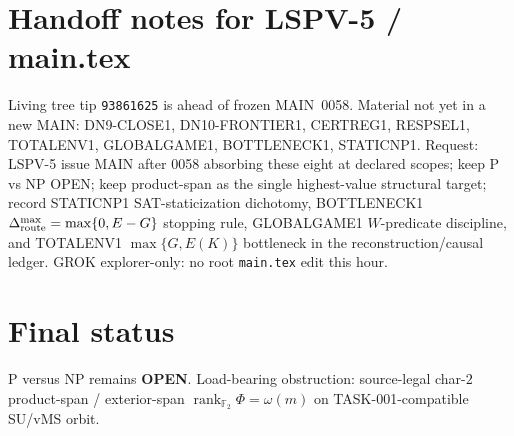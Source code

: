 \documentclass[11pt]{article}
\begin{document}
\section*{Handoff notes for LSPV-5 / main.tex}
Living tree tip \texttt{93861625} is ahead of frozen MAIN~0058. Material not yet
in a new MAIN: DN9-CLOSE1, DN10-FRONTIER1, CERTREG1, RESPSEL1, TOTALENV1,
GLOBALGAME1, BOTTLENECK1, STATICNP1. Request: LSPV-5 issue MAIN after 0058 absorbing
these eight at declared scopes; keep P vs NP OPEN; keep product-span as the single
highest-value structural target; record STATICNP1 SAT-staticization dichotomy,
BOTTLENECK1 $\Delta_{\rm route}^{\max}=\max\{0,E-G\}$ stopping rule, GLOBALGAME1
$W$-predicate discipline, and TOTALENV1 $\max\{G,E(K)\}$ bottleneck in the
reconstruction/causal ledger. GROK explorer-only: no root \texttt{main.tex} edit this
hour.

\section*{Final status}
P versus NP remains \textbf{OPEN}.
Load-bearing obstruction: source-legal char-$2$ product-span / exterior-span
$\operatorname{rank}_{\mathbb F_2}\Phi=\omega(m)$ on TASK-001-compatible SU/vMS
orbit.

\end{document}
